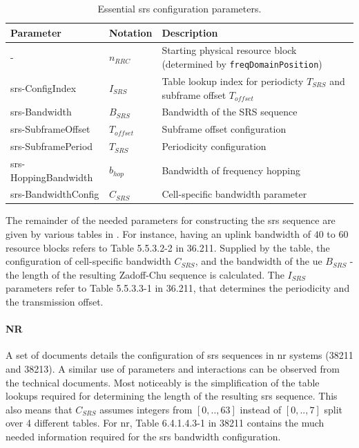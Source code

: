 \begin{table}[]
\begin{tabular}{@{}llp{8cm}@{}}
\toprule
Parameter            & Notation  & Description                                                           \\ \midrule
-                    & $n_{RRC}$    & Starting physical resource block (determined by \texttt{freqDomainPosition})   \\
srs-ConfigIndex      & $I_{SRS}$    & Table lookup index for periodicty $T_{SRS}$ and subframe offset $T_{offset}$   \\
srs-Bandwidth        & $B_{SRS}$    & Bandwidth of the SRS sequence                                        \\
srs-SubframeOffset   & $T_{offset}$ & Subframe offset configuration                                         \\
srs-SubframePeriod   & $T_{SRS}$    & Periodicity configuration                                             \\
srs-HoppingBandwidth & $b_{hop}$    & Bandwidth of frequency hopping                                        \\
srs-BandwidthConfig  & $C_{SRS}$    & Cell-specific bandwidth parameter                                     \\ \bottomrule
\end{tabular}
\vspace{1em}
\caption{Essential \gls{srs} configuration parameters.}\label{tab:srs_config_param}
\end{table}

The remainder of the needed parameters for constructing the \gls{srs} sequence are given by various tables in \cite{36211,3GPP2020TS15}. For instance, having an uplink bandwidth of $40$ to $60$ resource blocks refers to Table 5.5.3.2-2 in 36.211. Supplied by the table, the configuration of cell-specific bandwidth $C_{SRS}$, and the bandwidth of the \gls{ue} $B_{SRS}$ - the length of the resulting Zadoff-Chu sequence is calculated. The $I_{SRS}$ parameters refer to Table 5.5.3.3-1 in 36.211, that determines the periodicity and the transmission offset.


\paragraph{NR}
A set of documents details the configuration of \gls{srs} sequences in \gls{nr} systems \cite{38211, 3GPP2020TS15b} (38211 and 38213). A similar use of parameters and interactions can be observed from the technical documents. Most noticeably is the simplification of the table lookups required for determining the length of the resulting \gls{srs} sequence. This also means that $C_{SRS}$ assumes integers from $[0,.., 63]$ instead of $[0,..,7]$ split over 4 different tables. For \gls{nr}, Table 6.4.1.4.3-1 in 38211 contains the much needed information required for the \gls{srs} bandwidth configuration.
